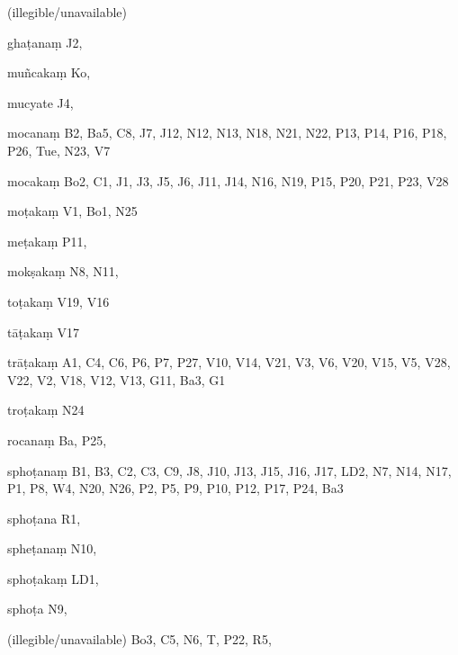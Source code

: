 \begin{marma}[hp02_009]
\begin{marma}[hp02_011]
\begin{marma}[hp02_30c]
\begin{description}
    \end{description}
 \end{marma}

 \begin{marma}[hp02_31cd]
\item[] 
\item[(illegible/unavailable)] 
  \begin{description}

    \end{description}
 \end{marma}

 \begin{marma}[hp02_33a]
\item[ghaṭanaṃ] J2, 
\item[muñcakaṃ] Ko,
\item[mucyate] J4,
\item[mocanaṃ] B2, Ba5, C8, J7, J12, N12, N13, N18, N21, N22, P13, P14, P16, P18, P26, Tue, N23, V7
\item[mocakaṃ] Bo2, C1, J1, J3, J5, J6, J11, J14, N16, N19, P15, P20, P21, P23, V28
\item[moṭakaṃ] V1, Bo1, N25 
\item[meṭakaṃ] P11, 
\item[mokṣakaṃ] N8, N11, 
\item[toṭakaṃ] V19, V16
\item[tāṭakaṃ] V17
\item[trāṭakaṃ] A1, C4, C6, P6, P7, P27, V10, V14, V21, V3, V6, V20, V15, V5, V28, V22, V2, V18, V12, V13, G11, Ba3, G1
\item[troṭakaṃ] N24
\item[rocanaṃ] Ba, P25, 
\item[sphoṭanaṃ] B1, B3, C2, C3, C9, J8, J10, J13, J15, J16, J17, LD2, N7, N14, N17, P1, P8, W4, N20, N26, P2, P5, P9, P10, P12, P17, P24, Ba3  
\item[sphoṭana] R1,
\item[spheṭanaṃ] N10,
\item[sphoṭakaṃ] LD1,
\item[sphoṭa] N9, 
\item[(illegible/unavailable)] Bo3, C5, N6, T, P22, R5,
  \begin{description}

    \end{description}
 \end{marma}


\end{marma}
\end{marma}
